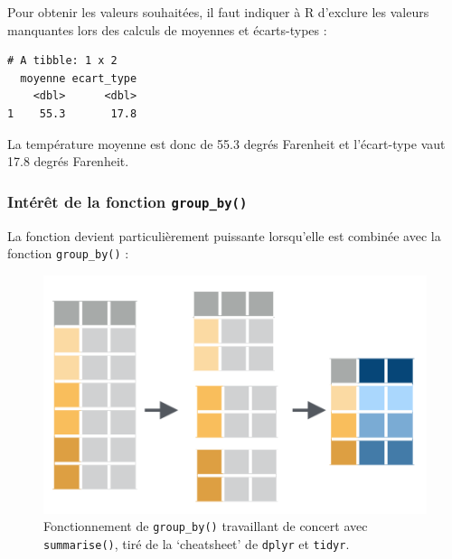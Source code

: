 \documentclass[
  a4paper,
]{article}
\newenvironment{Shaded}{\begin{snugshade}}{\end{snugshade}}
\newcommand{\DataTypeTok}[1]{\textcolor[rgb]{0.00,0.34,0.68}{#1}}
\newcommand{\KeywordTok}[1]{\textcolor[rgb]{0.12,0.11,0.11}{\textbf{#1}}}
\newcommand{\NormalTok}[1]{\textcolor[rgb]{0.12,0.11,0.11}{#1}}
\newcommand{\OperatorTok}[1]{\textcolor[rgb]{0.12,0.11,0.11}{#1}}
\newcommand{\OtherTok}[1]{\textcolor[rgb]{0.00,0.43,0.16}{#1}}
\newcommand{\StringTok}[1]{\textcolor[rgb]{0.75,0.01,0.01}{#1}}
\begin{document}
Pour obtenir les valeurs souhaitées, il faut indiquer à R d'exclure les valeurs manquantes lors des calculs de moyennes et écarts-types :

\begin{Shaded}
\end{Shaded}

\begin{verbatim}
# A tibble: 1 x 2
  moyenne ecart_type
    <dbl>      <dbl>
1    55.3       17.8
\end{verbatim}

La température moyenne est donc de 55.3 degrés Farenheit et l'écart-type vaut 17.8 degrés Farenheit.

\hypertarget{intuxe9ruxeat-de-la-fonction-group_by}{%
\subsubsection{\texorpdfstring{Intérêt de la fonction \texttt{group\_by()}}{Intérêt de la fonction group\_by()}}\label{intuxe9ruxeat-de-la-fonction-group_by}}

La fonction devient particulièrement puissante lorsqu'elle est combinée avec la fonction \texttt{group\_by()} :

\begin{figure}[htpb]

{\centering \includegraphics[width=0.65\linewidth]{images/groupby} 

}

\caption{Fonctionnement de \texttt{group\_by()} travaillant de concert avec \texttt{summarise()}, tiré de la `cheatsheet' de \texttt{dplyr} et \texttt{tidyr}.}\label{fig:groupby}
\end{figure}
\end{document}
